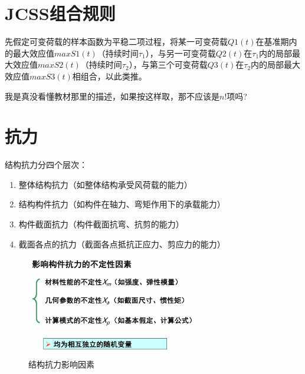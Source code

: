 \documentclass[12pt, a4paper, oneside, UTF8]{ctexbook}
\begin{document}
\section{JCSS组合规则}

\begin{theorem}
    先假定可变荷载的样本函数为平稳二项过程，将某一可变荷载$Q1(t)$在基准期内的最大效应值$maxS1(t)$（持续时间$\tau_1$），与另一可变荷载$Q2(t)$在$\tau_1$内的局部最大效应值$maxS2(t)$（持续时间$\tau_2$），与第三个可变荷载$Q3(t)$在$\tau_2$内的局部最大效应值$maxS3(t)$相组合，以此类推。
\end{theorem}

\begin{remark}
    我是真没看懂教材那里的描述，如果按这样取，那不应该是$n!$项吗?
\end{remark}

\section{抗力}

\begin{definition}
    结构抗力分四个层次：

    \begin{enumerate}
        \item 整体结构抗力（如整体结构承受风荷载的能力）
        \item 结构构件抗力（如构件在轴力、弯矩作用下的承载能力）
        \item 构件截面抗力（构件截面抗弯、抗剪的能力）
        \item 截面各点的抗力（截面各点抵抗正应力、剪应力的能力）
    \end{enumerate}
\end{definition}

\begin{figure}[H]
    \centering
    \includegraphics[width=0.7\textwidth]{../figure/yxys.png}
    \caption{结构抗力影响因素}
    \label{fig:chap5:fig2}
\end{figure}
\end{document}
